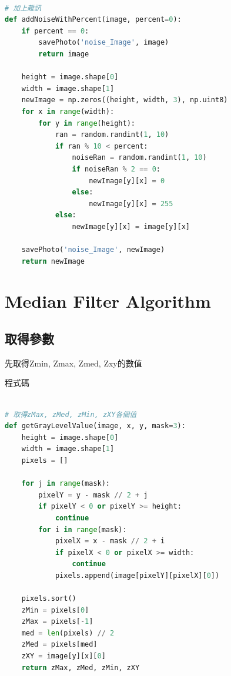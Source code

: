 \documentclass[12pt,a4paper]{article}
\begin{document}
{
\begin{lstlisting}[language=Python]

# 加上雜訊
def addNoiseWithPercent(image, percent=0):
    if percent == 0:
        savePhoto('noise_Image', image)
        return image

    height = image.shape[0]
    width = image.shape[1]
    newImage = np.zeros((height, width, 3), np.uint8)
    for x in range(width):
        for y in range(height):
            ran = random.randint(1, 10)
            if ran % 10 < percent:
                noiseRan = random.randint(1, 10)
                if noiseRan % 2 == 0:
                    newImage[y][x] = 0
                else:
                    newImage[y][x] = 255
            else:
                newImage[y][x] = image[y][x]

    savePhoto('noise_Image', newImage)
    return newImage
\end{lstlisting}
}

\newpage %
\section{Median Filter Algorithm}
\subsection{取得參數}
{
先取得Zmin, Zmax, Zmed, Zxy的數值

程式碼
\begin{lstlisting}[language=Python]

# 取得zMax, zMed, zMin, zXY各個值
def getGrayLevelValue(image, x, y, mask=3):
    height = image.shape[0]
    width = image.shape[1]
    pixels = []

    for j in range(mask):
        pixelY = y - mask // 2 + j
        if pixelY < 0 or pixelY >= height:
            continue
        for i in range(mask):
            pixelX = x - mask // 2 + i
            if pixelX < 0 or pixelX >= width:
                continue
            pixels.append(image[pixelY][pixelX][0])

    pixels.sort()
    zMin = pixels[0]
    zMax = pixels[-1]
    med = len(pixels) // 2
    zMed = pixels[med]
    zXY = image[y][x][0]
    return zMax, zMed, zMin, zXY
\end{lstlisting}
}

\newpage
\end{document}
